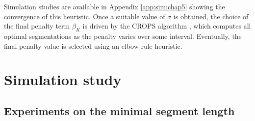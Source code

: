 Simulation studies are available in Appendix \ref{app:sim:chap5} showing the convergence of this heuristic. Once a suitable value of $\sigma$ is obtained, the choice of the final penalty term $\beta_K$ is driven by the CROPS algorithm \cite{haynes2017}, which computes all optimal segmentations as the penalty varies over some interval. Eventually, the final penalty value is selected using an elbow rule heuristic.


\section{Simulation study}\label{chp:4:4}

\subsection{Experiments on the minimal segment length}

